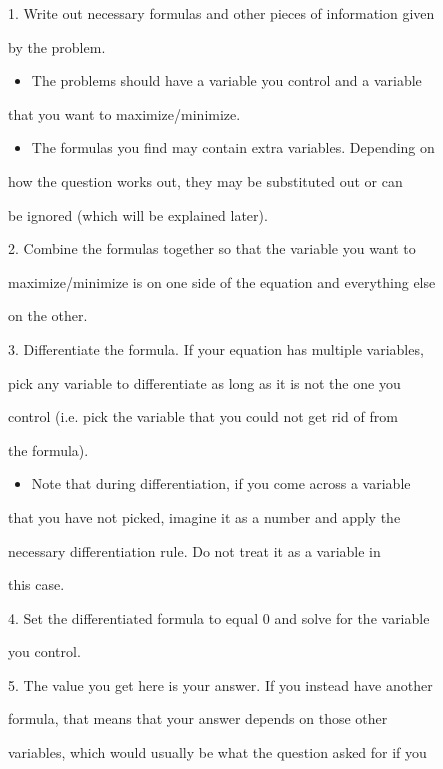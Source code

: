 1.  Write out necessary formulas and other pieces of information given

    by the problem.

\begin{itemize}
    \item The problems should have a variable you control and a variable
\end{itemize}
        that you want to maximize/minimize.

\begin{itemize}
    \item The formulas you find may contain extra variables. Depending on
\end{itemize}
        how the question works out, they may be substituted out or can

        be ignored (which will be explained later).

2.  Combine the formulas together so that the variable you want to

    maximize/minimize is on one side of the equation and everything else

    on the other.

3.  Differentiate the formula. If your equation has multiple variables,

    pick any variable to differentiate as long as it is not the one you

    control (i.e. pick the variable that you could not get rid of from

    the formula).

\begin{itemize}
    \item Note that during differentiation, if you come across a variable
\end{itemize}
        that you have not picked, imagine it as a number and apply the

        necessary differentiation rule. Do not treat it as a variable in

        this case.

4.  Set the differentiated formula to equal 0 and solve for the variable

    you control.

5.  The value you get here is your answer. If you instead have another

    formula, that means that your answer depends on those other

    variables, which would usually be what the question asked for if you

